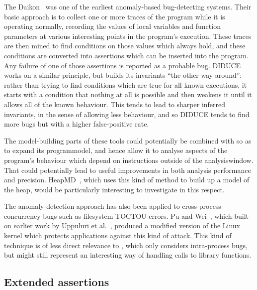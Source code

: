 The Daikon~\cite{Ernst2007} was one of the earliest anomaly-based
bug-detecting systems.  Their basic approach is to collect one or more
traces of the program while it is operating normally, recording the
values of local variables and function parameters at various
interesting points in the program's execution.  These traces are then
mined to find conditions on those values which always hold, and these
conditions are converted into assertions which can be inserted into
the program.  Any failure of one of those assertions is reported as a
probable bug.  DIDUCE~\cite{Hangal2002} works on a similar principle,
but builds its invariants ``the other way around'': rather than trying
to find conditions which are true for all known executions, it starts
with a condition that nothing at all is possible and then weakens it
until it allows all of the known behaviour.  This tends to lead to
sharper inferred invariants, in the sense of allowing less behaviour,
and so DIDUCE tends to find more bugs but with a higher false-positive
rate.

The model-building parts of these tools could potentially be combined
with {\technique} so as to expand its \gls{programmodel}, and hence
allow it to analyse aspects of the program's behaviour which depend on
instructions outside of the \gls{analysiswindow}.  That could
potentially lead to useful improvements in both analysis performance
and precision.  HeapMD~\cite{Chilimbi2006}, which uses this kind of
method to build up a model of the heap, would be particularly
interesting to investigate in this respect.

The anomaly-detection approach has also been applied to cross-process
concurrency bugs such as filesystem TOCTOU
errors\cite[pages~44--45]{Apple2012SecureCoding}.  Pu and
Wei~\cite{Pu2006}, which built on earlier work by Uppuluri et
al.~\cite{Uppuluri2005}, produced a modified version of the Linux
kernel which protects applications against this kind of attack.  This
kind of technique is of less direct relevance to {\technique}, which
only considers intra-process bugs, but might still represent an
interesting way of handling calls to library functions.




\subsection{Extended assertions}


